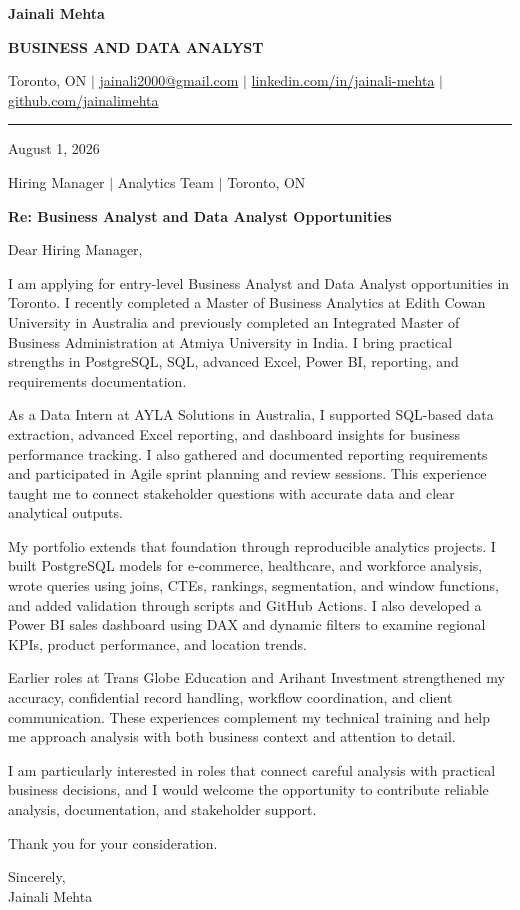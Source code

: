 \documentclass[letterpaper,10pt]{article}
\begin{document}
\fontsize{10.5}{13}\selectfont

{\fontsize{22}{24}\selectfont\bfseries\color{navy} Jainali Mehta}\par
{\fontsize{9.5}{11}\selectfont\bfseries\color{navy} BUSINESS AND DATA ANALYST}\par
\vspace{1pt}
{\small Toronto, ON $\vert$ \href{mailto:jainali2000@gmail.com}{jainali2000@gmail.com} $\vert$ \href{https://www.linkedin.com/in/jainali-mehta}{linkedin.com/in/jainali-mehta} $\vert$ \href{https://github.com/jainalimehta}{github.com/jainalimehta}}\par
\vspace{2pt}
{\color{navy}\rule{\textwidth}{0.8pt}}

August 1, 2026

Hiring Manager $\vert$ Analytics Team $\vert$ Toronto, ON

{\bfseries\color{navy} Re: Business Analyst and Data Analyst Opportunities}

Dear Hiring Manager,

I am applying for entry-level Business Analyst and Data Analyst opportunities in Toronto. I recently completed a Master of Business Analytics at Edith Cowan University in Australia and previously completed an Integrated Master of Business Administration at Atmiya University in India. I bring practical strengths in PostgreSQL, SQL, advanced Excel, Power BI, reporting, and requirements documentation.

As a Data Intern at AYLA Solutions in Australia, I supported SQL-based data extraction, advanced Excel reporting, and dashboard insights for business performance tracking. I also gathered and documented reporting requirements and participated in Agile sprint planning and review sessions. This experience taught me to connect stakeholder questions with accurate data and clear analytical outputs.

My portfolio extends that foundation through reproducible analytics projects. I built PostgreSQL models for e-commerce, healthcare, and workforce analysis, wrote queries using joins, CTEs, rankings, segmentation, and window functions, and added validation through scripts and GitHub Actions. I also developed a Power BI sales dashboard using DAX and dynamic filters to examine regional KPIs, product performance, and location trends.

Earlier roles at Trans Globe Education and Arihant Investment strengthened my accuracy, confidential record handling, workflow coordination, and client communication. These experiences complement my technical training and help me approach analysis with both business context and attention to detail.

I am particularly interested in roles that connect careful analysis with practical business decisions, and I would welcome the opportunity to contribute reliable analysis, documentation, and stakeholder support.

Thank you for your consideration.

Sincerely,\\
Jainali Mehta
\end{document}
